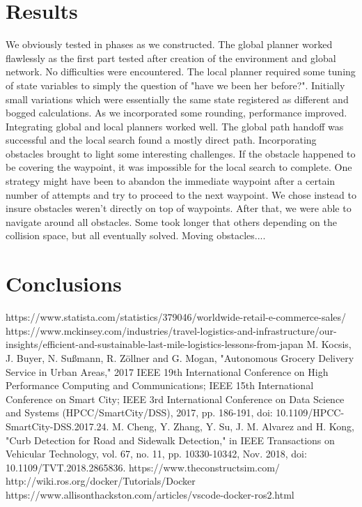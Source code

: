 \documentclass{article}
\begin{document}
\begin{multicols}{2}
\section*{Results}
We obviously tested in phases as we constructed.  The global planner worked flawlessly  as the first part tested after creation of the environment and global network.  No difficulties were encountered.  The local planner required some tuning of state variables to simply the question of "have we been her before?".  Initially small variations which were essentially the same state registered as different and bogged calculations.  As we incorporated some rounding, performance improved. \\
Integrating global and local planners worked well.  The global path handoff was successful and the local search found a mostly direct path.  Incorporating obstacles brought to light some interesting challenges.  If the obstacle happened to be covering the waypoint, it was impossible for the local search to complete.  One strategy might have been to abandon the immediate waypoint after a certain number of attempts and try to proceed to the next waypoint.  We chose instead to insure obstacles weren't directly on top of waypoints.  After that, we were able to navigate around all obstacles.  Some took longer that others depending on the collision space, but all eventually solved.  Moving obstacles....

\section*{Conclusions}


\label{References}


\begin{thebibliography}{10}
 https://www.statista.com/statistics/379046/worldwide-retail-e-commerce-sales/
https://www.mckinsey.com/industries/travel-logistics-and-infrastructure/our-insights/efficient-and-sustainable-last-mile-logistics-lessons-from-japan
M. Kocsis, J. Buyer, N. Sußmann, R. Zöllner and G. Mogan, "Autonomous Grocery Delivery Service in Urban Areas," 2017 IEEE 19th International Conference on High Performance Computing and Communications; IEEE 15th International Conference on Smart City; IEEE 3rd International Conference on Data Science and Systems (HPCC/SmartCity/DSS), 2017, pp. 186-191, doi: 10.1109/HPCC-SmartCity-DSS.2017.24.
M. Cheng, Y. Zhang, Y. Su, J. M. Alvarez and H. Kong, "Curb Detection for Road and Sidewalk Detection," in IEEE Transactions on Vehicular Technology, vol. 67, no. 11, pp. 10330-10342, Nov. 2018, doi: 10.1109/TVT.2018.2865836.
 https://www.theconstructsim.com/
 http://wiki.ros.org/docker/Tutorials/Docker
 https://www.allisonthackston.com/articles/vscode-docker-ros2.html




\end{thebibliography}
\end{multicols}
\end{document}

